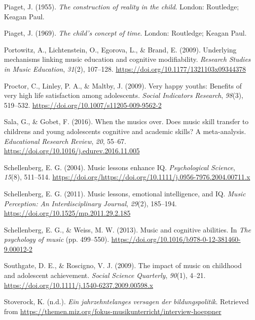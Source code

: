 \documentclass[a4, 12pt]{article}
\begin{document}
\leavevmode\hypertarget{ref-Piaget1955}{}%
Piaget, J. (1955). \emph{The construction of reality in the child}. London: Routledge; Keagan Paul.

\leavevmode\hypertarget{ref-Piaget1969}{}%
Piaget, J. (1969). \emph{The child's concept of time}. London: Routledge; Keagan Paul.

\leavevmode\hypertarget{ref-Portowitz2009}{}%
Portowitz, A., Lichtenstein, O., Egorova, L., \& Brand, E. (2009). Underlying mechanisms linking music education and cognitive modifiability. \emph{Research Studies in Music Education}, \emph{31}(2), 107--128. \url{https://doi.org/10.1177/1321103x09344378}

\leavevmode\hypertarget{ref-Proctor2009a}{}%
Proctor, C., Linley, P. A., \& Maltby, J. (2009). Very happy youths: Benefits of very high life satisfaction among adolescents. \emph{Social Indicators Research}, \emph{98}(3), 519--532. \url{https://doi.org/10.1007/s11205-009-9562-2}

\leavevmode\hypertarget{ref-Sala2016}{}%
Sala, G., \& Gobet, F. (2016). When the musics over. Does music skill transfer to childrens and young adolescents cognitive and academic skills? A meta-analysis. \emph{Educational Research Review}, \emph{20}, 55--67. \url{https://doi.org/10.1016/j.edurev.2016.11.005}

\leavevmode\hypertarget{ref-Schellenberg2004}{}%
Schellenberg, E. G. (2004). Music lessons enhance IQ. \emph{Psychological Science}, \emph{15}(8), 511--514. \url{https://doi.org/https://doi.org/10.1111/j.0956-7976.2004.00711.x}

\leavevmode\hypertarget{ref-Schellenberg2011a}{}%
Schellenberg, E. G. (2011). Music lessons, emotional intelligence, and IQ. \emph{Music Perception: An Interdisciplinary Journal}, \emph{29}(2), 185--194. \url{https://doi.org/10.1525/mp.2011.29.2.185}

\leavevmode\hypertarget{ref-Schellenberg2013}{}%
Schellenberg, E. G., \& Weiss, M. W. (2013). Music and cognitive abilities. In \emph{The psychology of music} (pp. 499--550). \url{https://doi.org/10.1016/b978-0-12-381460-9.00012-2}

\leavevmode\hypertarget{ref-Southgate2009}{}%
Southgate, D. E., \& Roscigno, V. J. (2009). The impact of music on childhood and adolescent achievement. \emph{Social Science Quarterly}, \emph{90}(1), 4--21. \url{https://doi.org/10.1111/j.1540-6237.2009.00598.x}

\leavevmode\hypertarget{ref-Stoverock}{}%
Stoverock, K. (n.d.). \emph{Ein jahrzehntelanges versagen der bildungspolitik}. Retrieved from \url{https://themen.miz.org/fokus-musikunterricht/interview-hoeppner}
\end{document}
